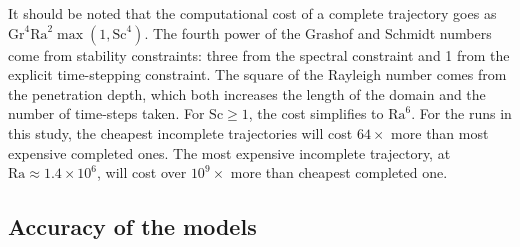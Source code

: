 It should be noted that the computational cost of a complete trajectory goes as $\text{Gr}^4 \text{Ra}^2 \max(1, \text{Sc}^4)$.
The fourth power of the Grashof and Schmidt numbers come from stability constraints: three from the spectral constraint and 1 from the explicit time-stepping constraint.
The square of the Rayleigh number comes from the penetration depth, which both increases the length of the domain and the number of time-steps taken.
For $\text{Sc} \ge 1$, the cost simplifies to $\text{Ra}^6$.
For the runs in this study, the cheapest incomplete trajectories will cost $64\times$ more than most expensive completed ones.
The most expensive incomplete trajectory, at $\text{Ra} \approx 1.4\times 10^6$, will cost over $10^9\times$ more than cheapest completed one.

\subsection{Accuracy of the models}

